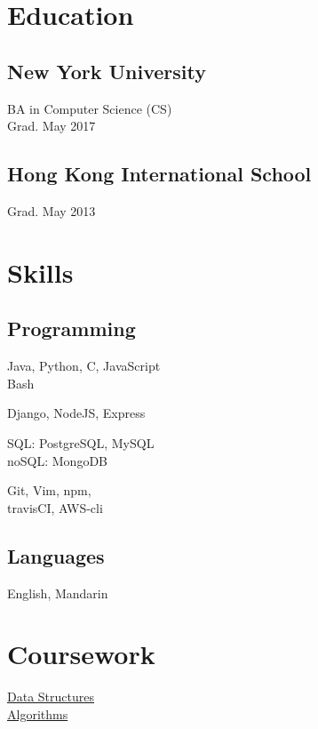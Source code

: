 \documentclass[]{hieudo-build}
\begin{document}
\begin{minipage}[t]{0.34\textwidth} 

\section{Education} 

\subsection{New York University}
BA in Computer Science (CS) \\
Grad. May 2017 \\
\sectionsep

\subsection{Hong Kong International School}
Grad. May 2013 \\
\sectionsep

\section{Skills}
\subsection{Programming}
Java, Python, C, JavaScript\\
Bash
\newline

Django, NodeJS, Express
\newline

SQL: PostgreSQL, MySQL\\
noSQL: MongoDB
\newline

Git, Vim, npm,\\
travisCI, AWS-cli

\sectionsep

\subsection{Languages}
 English, Mandarin\\
\sectionsep

\section{Coursework}
\href{https://github.com/JasonYao/Fall2014NYU-DataStructures}{Data Structures}\\
\href{https://github.com/JasonYao/Algorithmic-Problem-Solving}{Algorithms}\\


\end{minipage}
\end{document}
